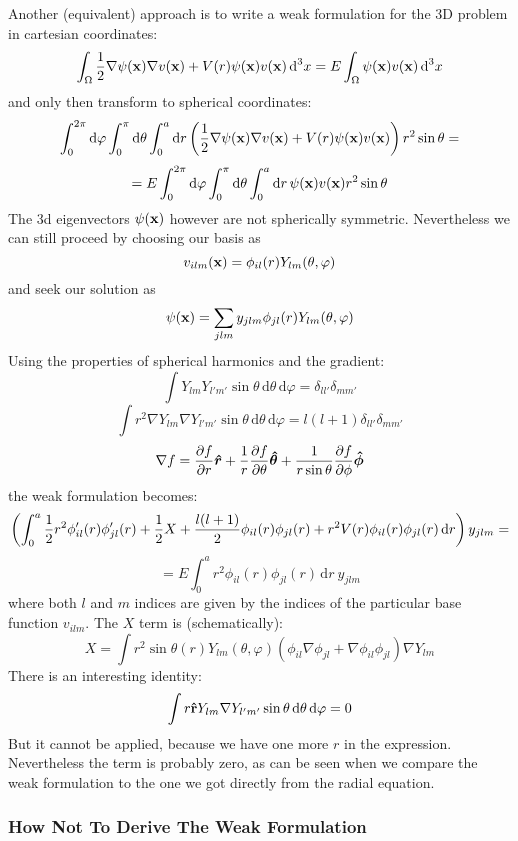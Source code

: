 \documentclass[12pt]{article}
\def\d{\mbox{d}}
\begin{document}
Another (equivalent) approach is to write a weak formulation for
the 3D problem in cartesian coordinates:
$$
\int_\Omega{1\over2}\nabla\psi({\bf x})\nabla v({\bf x})+V(r)\psi({\bf x})v({\bf
x})\,\d^3 x
=E\int_\Omega\psi({\bf x})v({\bf x})\,\d^3 x
$$
and only then transform to spherical coordinates:
$$
\int_0^{2\pi}\d\varphi\int_0^\pi\d\theta\int_0^a\d r
\left({1\over2}\nabla\psi({\bf x})\nabla v({\bf x})+V(r)\psi({\bf
x})v({\bf x})\right)r^2\sin\theta=
$$
$$
=
E\int_0^{2\pi}\d\varphi\int_0^\pi\d\theta\int_0^a\d r\,
\psi({\bf x})v({\bf x})r^2\sin\theta
$$
The 3d eigenvectors $\psi({\bf x})$ however are not spherically symmetric.
Nevertheless we can still proceed by choosing our basis as
$$v_{ilm}({\bf x})=\phi_{il}(r)Y_{lm}(\theta, \varphi)$$
and seek our solution as
$$\psi({\bf x})=\sum_{jlm}y_{jlm}\phi_{jl}(r)Y_{lm}(\theta, \varphi)$$
Using the properties of spherical harmonics and the gradient:
$$\int Y_{lm} Y_{l'm'} \sin\theta\,\d\theta\,\d\varphi=
\delta_{ll'}\delta_{mm'}$$
$$\int r^2\nabla Y_{lm} \nabla Y_{l'm'} \sin\theta\,\d\theta\,\d\varphi=
l(l+1)\delta_{ll'}\delta_{mm'}$$
$$\nabla f = {\partial f\over \partial r}\boldsymbol{\hat r} + {1\over r}
{\partial f\over\partial\theta}\boldsymbol{\hat\theta}+{1\over r\sin\theta}
{\partial f\over\partial\phi}\boldsymbol{\hat\phi}$$
the weak formulation becomes:
$$
\left(\int_0^a
{1\over2}r^2\phi_{il}'(r)\phi_{jl}'(r)+
{1\over2}X+
{l(l+1)\over2}\phi_{il}(r)\phi_{jl}(r)+
r^2V(r)\phi_{il}(r)\phi_{jl}(r)\,\d r\right)y_{jlm}=
$$
$$ = E\int_0^ar^2 \phi_{il}(r)\phi_{jl}(r)\,\d r\ y_{jlm} $$
where both $l$ and $m$ indices are given by the indices of the particular base
function $v_{ilm}$. The $X$ term is (schematically):
$$X=\int r^2\sin\theta(r)Y_{lm}(\theta,\varphi)
(\phi_{il}\nabla\phi_{jl}+\nabla\phi_{il}\phi_{jl})
\nabla Y_{lm}$$
There is an interesting identity:
$$\int r{\bf \hat r} Y_{lm} \nabla Y_{l'm'} \sin\theta\,\d\theta\,\d\varphi=
0$$
But it cannot be applied, because we have one more $r$ in the expression.
Nevertheless the term is probably zero, as can be seen when we compare the weak
formulation to the one we got directly from the radial equation.

\subsubsection{How Not To Derive The Weak Formulation}
\end{document}
